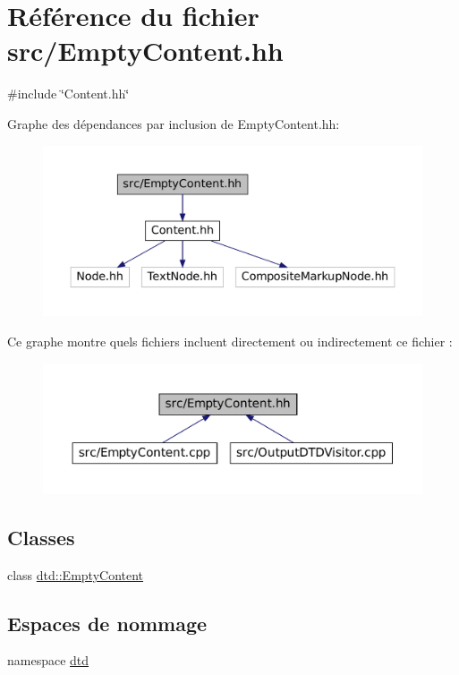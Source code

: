 \hypertarget{_empty_content_8hh}{
\section{Référence du fichier src/EmptyContent.hh}
\label{_empty_content_8hh}
}
{\ttfamily \#include \char`\"{}Content.hh\char`\"{}}\par
Graphe des dépendances par inclusion de EmptyContent.hh:\nopagebreak
\begin{figure}[H]
\begin{center}
\leavevmode
\includegraphics[width=400pt]{_empty_content_8hh__incl}
\end{center}
\end{figure}
Ce graphe montre quels fichiers incluent directement ou indirectement ce fichier :\nopagebreak
\begin{figure}[H]
\begin{center}
\leavevmode
\includegraphics[width=400pt]{_empty_content_8hh__dep__incl}
\end{center}
\end{figure}
\subsection*{Classes}
\begin{DoxyCompactItemize}
\item 
class \hyperlink{classdtd_1_1_empty_content}{dtd::EmptyContent}
\end{DoxyCompactItemize}
\subsection*{Espaces de nommage}
\begin{DoxyCompactItemize}
\item 
namespace \hyperlink{namespacedtd}{dtd}
\end{DoxyCompactItemize}
